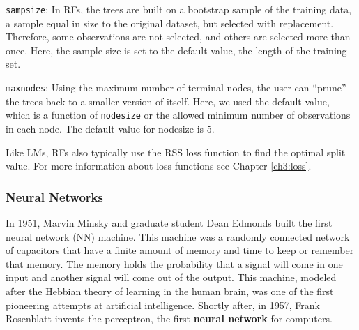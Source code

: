 {\tt sampsize}: In RFs, the trees are built on a bootstrap sample of the training data, a sample equal in size to the original dataset, but selected with replacement. Therefore, some observations are not selected, and others are selected more than once. Here, the sample size is set to the default value, the length of the training set.

{\tt maxnodes}: Using the maximum number of terminal nodes, the user can ``prune'' the trees back to a smaller version of itself. Here, we used the default value, which is a function of {\tt nodesize} or the allowed minimum number of observations in each node. The default value for nodesize is 5.   


Like LMs, RFs also typically use the RSS loss function to find the optimal split value. For more information about loss functions see Chapter \ref{ch3:loss}.


\subsubsection*{Neural Networks} 
In 1951, Marvin Minsky and graduate student Dean Edmonds built the first neural network (NN) machine. This machine was a randomly connected network of capacitors that have a finite amount of memory and time to keep or remember that memory. The memory holds the probability that a signal will come in one input and another signal will come out of the output. This machine, modeled after the Hebbian theory of learning in the human brain, was one of the first pioneering attempts at artificial intelligence. Shortly after, in 1957, Frank Rosenblatt invents the perceptron, the first \textbf{neural network} for computers. 

